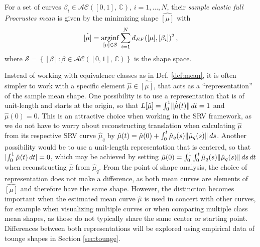 \begin{definition}
  \label{def:mean}
  For a set of curves $\beta_i \in \mathcal{AC}([0,1],\, \mathbb{C})$, $i = 1,\dots,N$,  their \emph{sample elastic full Procrustes mean} is given by the minimizing shape $\hat{[\mu]}$ with
  $$ \hat{[\mu]} = \operatorname*{arginf}_{[\mu] \in \mathcal{S}} \sum_{i=1}^N d_{EF}([\mu], [\beta_i])^2\,,$$
  where $\mathcal{S} = \left\{ [\beta] : \beta \in \mathcal{AC}([0,1],\,\mathbb{C}) \right\}$ is the shape space.
\end{definition}

Instead of working with equivalence classes as in Def. \ref{def:mean}, it is often simpler to work with a specific element $\hat\mu \in \hat{[\mu]}$, that acts as a \enquote{representation} of the sample mean shape.
One possibility is to use a representation that is of unit-length and starts at the origin, so that $L[\hat\mu] = \int_0^1 \lVert\dot{\hat\mu}(t)\rVert\, dt = 1$ and $\hat\mu(0) = 0$.
This is an attractive choice when working in the SRV framework, as we do not have to worry about reconstructing translation when calculating $\hat\mu$ from its respective SRV curve $\hat\mu_q$ by $\hat\mu(t) = \hat\mu(0) + \int_0^t \hat\mu_q(s) \lVert\hat\mu_q(s)\rVert\,ds$.
Another possibility would be to use a unit-length representation that is centered, so that $\lvert\int_0^1 \hat\mu(t)\, dt\rvert = 0$, which may be achieved by setting $\hat\mu(0) = \int_0^1 \int_0^t \hat\mu_q(s) \lVert \hat\mu_q(s)\rVert\,ds\,dt$ when reconstructing $\hat\mu$ from $\hat\mu_q$.
From the point of shape analysis, the choice of representation does not make a difference, as both mean curves are elements of $\hat{[\mu]}$ and therefore have the same shape.
However, the distinction becomes important when the estimated mean curve $\hat\mu$ is used in concert with other curves, for example when visualizing multiple curves or when comparing multiple class mean shapes, as those do not typically share the same center or starting point.
Differences between both representations will be explored using empirical data of tounge shapes in Section \ref{sec:tounge}.

